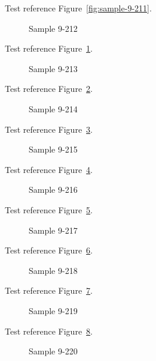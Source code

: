 Test reference Figure~\ref{fig:sample-9-211}.

\begin{figure}[tbhp]
\caption{Sample 9-212}
\label{fig:sample-9-212}
\end{figure}

Test reference Figure~\ref{fig:sample-9-212}.

\begin{figure}[tbhp]
\caption{Sample 9-213}
\label{fig:sample-9-213}
\end{figure}

Test reference Figure~\ref{fig:sample-9-213}.

\begin{figure}[tbhp]
\caption{Sample 9-214}
\label{fig:sample-9-214}
\end{figure}

Test reference Figure~\ref{fig:sample-9-214}.

\begin{figure}[tbhp]
\caption{Sample 9-215}
\label{fig:sample-9-215}
\end{figure}

Test reference Figure~\ref{fig:sample-9-215}.

\begin{figure}[tbhp]
\caption{Sample 9-216}
\label{fig:sample-9-216}
\end{figure}

Test reference Figure~\ref{fig:sample-9-216}.

\begin{figure}[tbhp]
\caption{Sample 9-217}
\label{fig:sample-9-217}
\end{figure}

Test reference Figure~\ref{fig:sample-9-217}.

\begin{figure}[tbhp]
\caption{Sample 9-218}
\label{fig:sample-9-218}
\end{figure}

Test reference Figure~\ref{fig:sample-9-218}.

\begin{figure}[tbhp]
\caption{Sample 9-219}
\label{fig:sample-9-219}
\end{figure}

Test reference Figure~\ref{fig:sample-9-219}.

\begin{figure}[tbhp]
\caption{Sample 9-220}
\label{fig:sample-9-220}
\end{figure}

